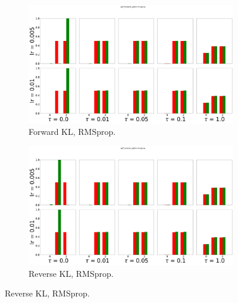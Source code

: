 \documentclass{article}
\begin{document}
\begin{figure}[!ht]
  \begin{subfigure}[b]{0.4\linewidth}
    \centering
    \includegraphics[width=1\columnwidth]{figs/discrete-bandit/notlearnQ/rmsprop/pdf_forward_optim=rmsprop.png}
    \caption{Forward KL, RMSprop.}
    \label{fig:discrete-bandit-pdf-forward-rmsprop}
  \end{subfigure}%
  \begin{subfigure}[b]{0.4\linewidth}
    \centering
    \includegraphics[width=1\columnwidth]{figs/discrete-bandit/notlearnQ/rmsprop/pdf_reverse_optim=rmsprop.png}
    \caption{Reverse KL, RMSprop.}
    \label{fig:discrete-bandit-pdf-reverse-rmsprop}
  \end{subfigure}
  

\end{figure}
\end{document}
